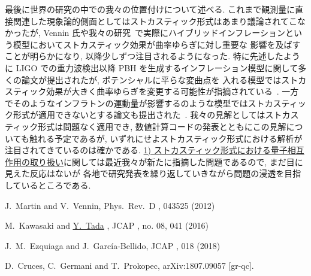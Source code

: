 \documentclass[11pt,a4j,dvipdfmx]{jarticle} 					%
\newcommand{\研究課題名}{\mgfamily\sffamily ストカスティック形式で迫る重力と量子論}
\newcommand{\研究機関名}{\mgfamily\sffamily 名古屋大学}
\newcommand{\研究代表者氏名}{\mgfamily\sffamily 多田祐一郎}
\newcommand{\me}{\underline{\underline{Y.~Tada}} }
\newcommand{\研究期間の最終元号年度}{34}  %
\renewcommand{\bf}{\bfseries\sffamily\gtfamily}
\begin{document}
最後に世界の研究の中での我々の位置付けについて述べる. これまで観測量に直接関連した現象論的側面としてはストカスティック形式はあまり議論されてこなかったが,
Vennin 氏や我々の研究~\cite{Kawasaki:2015ppx}で実際にハイブリッドインフレーションという模型においてストカスティック効果が曲率ゆらぎに対し重要な
影響を及ばすことが明らかになり, 以降少しずつ注目されるようになった.
特に先述したように LIGO での重力波検出以降 PBH を生成するインフレーション模型に関して多くの論文が提出されたが, ポテンシャルに平らな変曲点を
入れる模型ではストカスティック効果が大きく曲率ゆらぎを変更する可能性が指摘されている~\cite{Ezquiaga:2018gbw}.
一方でそのようなインフラトンの運動量が影響するのような模型ではストカスティック形式が適用できないとする論文も提出された~\cite{Cruces:2018cvq}.
我々の見解としてはストカスティック形式は問題なく適用でき, 数値計算コードの発表とともにこの見解についても触れる予定であるが,
いずれにせよストカスティック形式における解析が注目されてきているのは確かである.
\ul{1) ストカスティック形式における量子相互作用の取り扱い}に関しては最近我々が新たに指摘した問題であるので, まだ目に見えた反応はないが
各地で研究発表を繰り返していきながら問題の浸透を目指しているところである.






\vspace{1cm}
\begin{thebibliography}{99}
  J.~Martin and V.~Vennin,
  Phys.\ Rev.\ D {\bf 85}, 043525 (2012)
  
  M.~Kawasaki and \me,
  JCAP {\bf 1608}, no. 08, 041 (2016)
  
  J.~M.~Ezquiaga and J.~Garc\'ia-Bellido,
  JCAP {\bf 1808}, 018 (2018)
  
  D.~Cruces, C.~Germani and T.~Prokopec,
  arXiv:1807.09057 [gr-qc].
\end{thebibliography}
\end{document}
